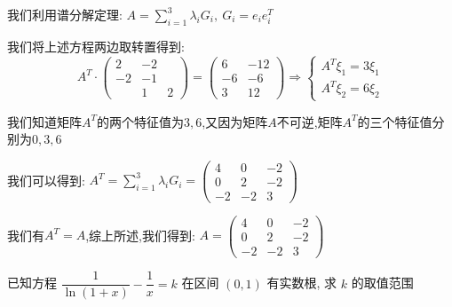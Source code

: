 \begin{solution}

	我们利用谱分解定理:  $A=\sum\limits_{i=1}^{3}\lambda_{i}G_{i},\ G_{i}=e_{i}e_{i}^{T}$
	
	我们将上述方程两边取转置得到:  
	$$A^{T}\cdot\left(\begin{matrix}
		2&-2\\-2&-1\\&1&2
	\end{matrix} \right)=\left(\begin{matrix}
	6&-12\\-6&-6\\3&12
\end{matrix} \right)\Rightarrow \left\lbrace
\begin{array}{l}
A^{T}\xi_{1}=3\xi_{1}\\
A^{T}\xi_{2}=6\xi_{2}
\end{array}
\right. $$

我们知道矩阵$A^{T}$的两个特征值为$3,6$,又因为矩阵$A$不可逆,矩阵$A^{T}$的三个特征值分别为$0,3,6$

我们可以得到:  $A^{T}=\sum\limits_{i=1}^{3}\lambda_{i}G_{i}=\left(\begin{matrix}
	4&0&-2\\0&2&-2\\-2&-2&3
\end{matrix} \right)$

我们有$A^{T}=A$,综上所述,我们得到:  $A=\left(\begin{matrix}
	4&0&-2\\0&2&-2\\-2&-2&3
\end{matrix} \right)$
\end{solution}


\begin{example}[][Exam: 35.2.4]
	已知方程 $\dfrac{1}{\ln(1+x)}-\dfrac{1}{x}=k$ 在区间 $(0,1)$ 有实数根, 求 $k$ 的取值范围
\end{example}

